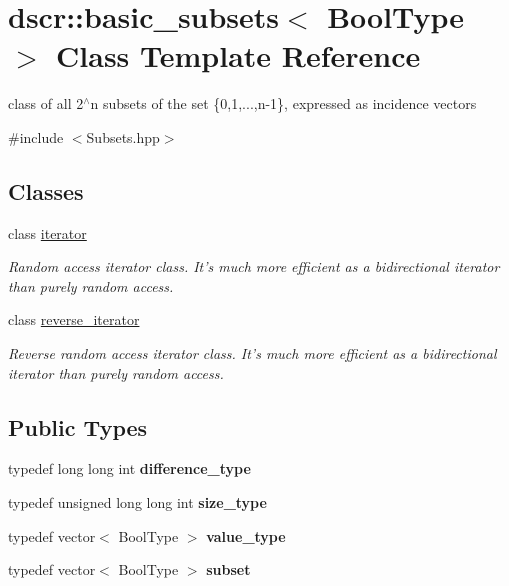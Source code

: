 \hypertarget{classdscr_1_1basic__subsets}{\section{dscr\-:\-:basic\-\_\-subsets$<$ Bool\-Type $>$ Class Template Reference}
\label{classdscr_1_1basic__subsets}
}


class of all 2$^\wedge$n subsets of the set \{0,1,...,n-\/1\}, expressed as incidence vectors  




{\ttfamily \#include $<$Subsets.\-hpp$>$}

\subsection*{Classes}
\begin{DoxyCompactItemize}
\item 
class \hyperlink{classdscr_1_1basic__subsets_1_1iterator}{iterator}
\begin{DoxyCompactList}\small\item\em Random access iterator class. It's much more efficient as a bidirectional iterator than purely random access. \end{DoxyCompactList}\item 
class \hyperlink{classdscr_1_1basic__subsets_1_1reverse__iterator}{reverse\-\_\-iterator}
\begin{DoxyCompactList}\small\item\em Reverse random access iterator class. It's much more efficient as a bidirectional iterator than purely random access. \end{DoxyCompactList}\end{DoxyCompactItemize}
\subsection*{Public Types}
\begin{DoxyCompactItemize}
\item 
\hypertarget{classdscr_1_1basic__subsets_ac915aaf8c4cff2691fcd5b2f90f316bc}{typedef long long int {\bfseries difference\-\_\-type}}\label{classdscr_1_1basic__subsets_ac915aaf8c4cff2691fcd5b2f90f316bc}

\item 
\hypertarget{classdscr_1_1basic__subsets_a787ca48fa5a84c9032e69e8b4917c6da}{typedef unsigned long long int {\bfseries size\-\_\-type}}\label{classdscr_1_1basic__subsets_a787ca48fa5a84c9032e69e8b4917c6da}

\item 
\hypertarget{classdscr_1_1basic__subsets_afe3b164a403a8d6f8bdac3abe263450f}{typedef vector$<$ Bool\-Type $>$ {\bfseries value\-\_\-type}}\label{classdscr_1_1basic__subsets_afe3b164a403a8d6f8bdac3abe263450f}

\item 
\hypertarget{classdscr_1_1basic__subsets_a79ebdac5d0cdf2c5b81c1477d533b945}{typedef vector$<$ Bool\-Type $>$ {\bfseries subset}}\label{classdscr_1_1basic__subsets_a79ebdac5d0cdf2c5b81c1477d533b945}

\end{DoxyCompactItemize}

